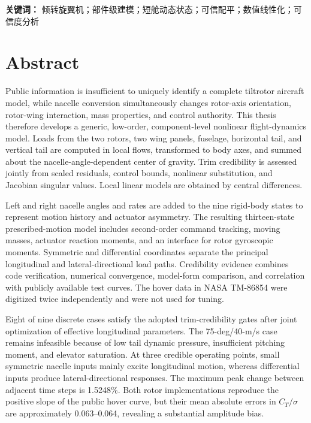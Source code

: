 \documentclass[UTF8,12pt,oneside,openany,fontset=windows]{ctexbook}
\begin{document}
\textbf{关键词：} 倾转旋翼机；部件级建模；短舱动态状态；可信配平；数值线性化；可信度分析

\chapter*{Abstract}
\small

Public information is insufficient to uniquely identify a complete tiltrotor aircraft model, while nacelle conversion simultaneously changes rotor-axis orientation, rotor-wing interaction, mass properties, and control authority. This thesis therefore develops a generic, low-order, component-level nonlinear flight-dynamics model. Loads from the two rotors, two wing panels, fuselage, horizontal tail, and vertical tail are computed in local flows, transformed to body axes, and summed about the nacelle-angle-dependent center of gravity. Trim credibility is assessed jointly from scaled residuals, control bounds, nonlinear substitution, and Jacobian singular values. Local linear models are obtained by central differences.

Left and right nacelle angles and rates are added to the nine rigid-body states to represent motion history and actuator asymmetry. The resulting thirteen-state prescribed-motion model includes second-order command tracking, moving masses, actuator reaction moments, and an interface for rotor gyroscopic moments. Symmetric and differential coordinates separate the principal longitudinal and lateral-directional load paths. Credibility evidence combines code verification, numerical convergence, model-form comparison, and correlation with publicly available test curves. The hover data in NASA TM-86854 were digitized twice independently and were not used for tuning.

Eight of nine discrete cases satisfy the adopted trim-credibility gates after joint optimization of effective longitudinal parameters. The 75-deg/40-m/s case remains infeasible because of low tail dynamic pressure, insufficient pitching moment, and elevator saturation. At three credible operating points, small symmetric nacelle inputs mainly excite longitudinal motion, whereas differential inputs produce lateral-directional responses. The maximum peak change between adjacent time steps is 1.5248\%. Both rotor implementations reproduce the positive slope of the public hover curve, but their mean absolute errors in \(C_T/\sigma\) are approximately 0.063--0.064, revealing a substantial amplitude bias.
\end{document}
